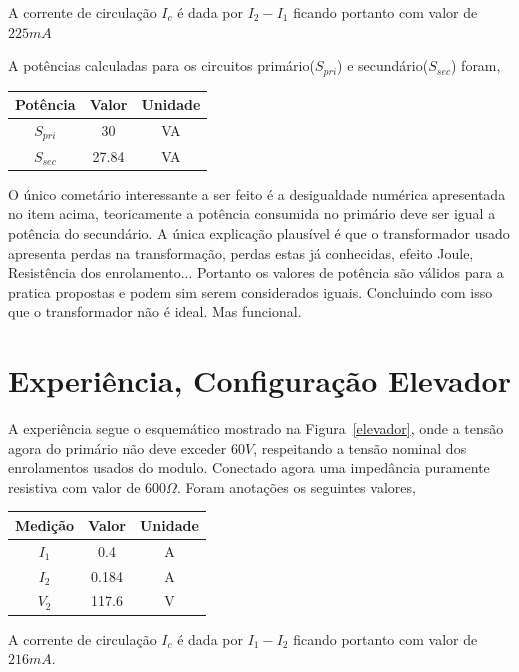 \documentclass[paper=a4, fontsize=11pt]{article}
\begin{document}
A corrente de circulação $I_c$ é dada por $I_2 - I_1$ ficando portanto com 
valor de $225 mA$

A potências calculadas para os circuitos primário($S_{pri}$) e secundário($S_{sec}$) foram, 


\begin{center}
    \begin{tabular}{c||c||c}
        Potência & Valor & Unidade \\
        \hline
        $S_{pri}$ & 30 & VA \\
        $S_{sec}$ & 27.84 & VA \\
    \end{tabular}
\end{center}

O único cometário interessante a ser feito é a desigualdade numérica apresentada no 
item acima, teoricamente a potência consumida no primário deve ser igual a potência
do secundário. A única explicação plausível é que o transformador usado apresenta
perdas na transformação, perdas estas já conhecidas, efeito Joule, Resistência dos
enrolamento... Portanto os valores de potência são válidos para a pratica propostas
e podem sim serem considerados iguais. Concluindo com isso que o transformador
não é ideal. Mas funcional.

\section{Experiência, Configuração Elevador}

A experiência segue o esquemático mostrado na Figura~\ref{elevador}, onde a tensão
agora do primário não deve exceder $60 V$, respeitando a tensão nominal dos 
enrolamentos usados do modulo. Conectado agora uma impedância puramente
resistiva com valor de $600 \Omega$. Foram anotações os seguintes valores,

\begin{center}
    \begin{tabular}{c||c||c}
        Medição & Valor & Unidade \\
        \hline
        $I_1$ & 0.4 & A \\
        $I_2$ & 0.184 & A \\
        $V_2$ & 117.6 & V \\
    \end{tabular}
\end{center}

A corrente de circulação $I_c$ é dada por $I_1 - I_2$ ficando portanto com 
valor de $216 mA$.
\end{document}
